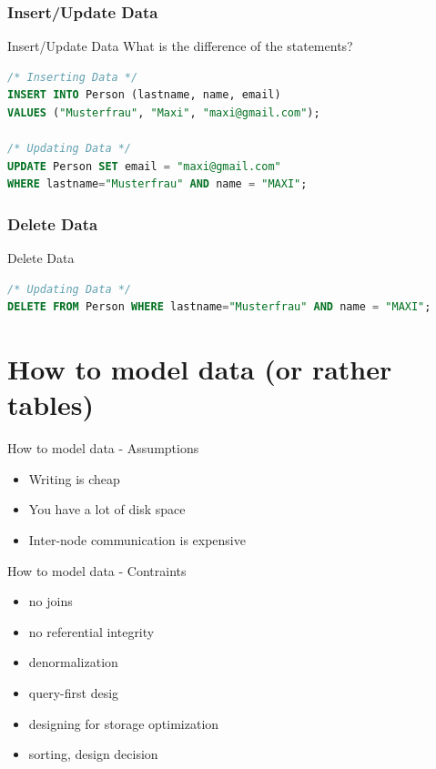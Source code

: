 \documentclass[
  10pt
]{beamer}
\begin{document}
\subsubsection{Insert/Update Data}
\begin{frame}[fragile]{Insert/Update Data}
  What is the difference of the statements?
  \begin{lstlisting}[language=SQL]
/* Inserting Data */
INSERT INTO Person (lastname, name, email)
VALUES ("Musterfrau", "Maxi", "maxi@gmail.com");

/* Updating Data */
UPDATE Person SET email = "maxi@gmail.com"
WHERE lastname="Musterfrau" AND name = "MAXI";
  \end{lstlisting}
\end{frame}

\subsubsection{Delete Data}
\begin{frame}[fragile]{Delete Data}
  \begin{lstlisting}[language=SQL]
/* Updating Data */
DELETE FROM Person WHERE lastname="Musterfrau" AND name = "MAXI";
  \end{lstlisting}
\end{frame}

\section{How to model data (or rather tables)}  %

\begin{frame}{How to model data - Assumptions}
  \begin{itemize}
    \item Writing is cheap
    \item You have a lot of disk space
    \item Inter-node communication is expensive
  \end{itemize}
\end{frame}

\begin{frame}{How to model data - Contraints}
  \begin{itemize}
    \item no joins
    \item no referential integrity
    \item denormalization
    \item query-first desig
    \item designing for storage optimization
    \item sorting, design decision
  \end{itemize}
\end{frame}
\end{document}

